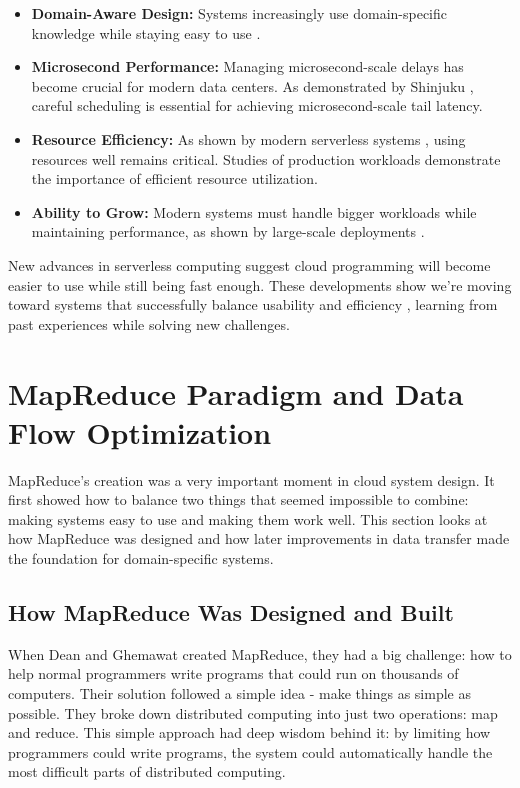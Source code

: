 \documentclass[12pt]{article}
\begin{document}
\begin{itemize}
\item \textbf{Domain-Aware Design:} Systems increasingly use domain-specific knowledge while staying easy to use \cite{gonzalez2012powergraph, elseidy2014grami, jahani2011optimization}.

\item \textbf{Microsecond Performance:} Managing microsecond-scale delays \cite{barroso2017attack, dean2013tail} has become crucial for modern data centers. As demonstrated by Shinjuku \cite{kaffes2019shinjuku}, careful scheduling is essential for achieving microsecond-scale tail latency.

\item \textbf{Resource Efficiency:} As shown by modern serverless systems \cite{shahrad2020serverless, agache2020firecracker}, using resources well remains critical. Studies of production workloads \cite{atikoglu2012workload, cao2020rocksdb} demonstrate the importance of efficient resource utilization.

\item \textbf{Ability to Grow:} Modern systems must handle bigger workloads while maintaining performance, as shown by large-scale deployments \cite{chen2016realtime, bronson2013tao}.
\end{itemize}

New advances in serverless computing \cite{jonas2019cloud, li2022serverless} suggest cloud programming will become easier to use while still being fast enough. These developments show we're moving toward systems that successfully balance usability and efficiency \cite{mcsherry2015scalability}, learning from past experiences while solving new challenges.

\section{MapReduce Paradigm and Data Flow Optimization}

MapReduce's creation was a very important moment in cloud system design. It first showed how to balance two things that seemed impossible to combine: making systems easy to use and making them work well. This section looks at how MapReduce was designed and how later improvements in data transfer made the foundation for domain-specific systems.

\subsection{How MapReduce Was Designed and Built}
When Dean and Ghemawat created MapReduce, they had a big challenge: how to help normal programmers write programs that could run on thousands of computers. Their solution followed a simple idea - make things as simple as possible. They broke down distributed computing into just two operations: map and reduce. This simple approach had deep wisdom behind it: by limiting how programmers could write programs, the system could automatically handle the most difficult parts of distributed computing.
\end{document}
